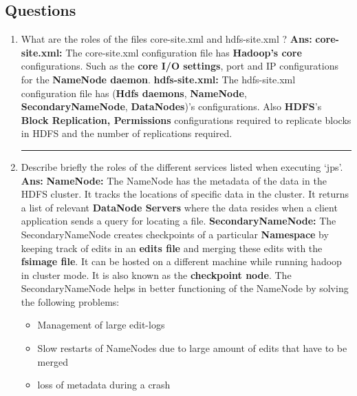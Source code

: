 \documentclass[12pt]{article}
\begin{document}
\subsection{Questions}
\begin{enumerate}
\item What are the roles of the files core-site.xml and hdfs-site.xml ?
\newline
\newline
\textbf{Ans:}
\newline
	\textbf{core-site.xml:}
    \newline
    	The core-site.xml configuration file has \textbf{Hadoop's core} configurations. Such as the \textbf{core I/O settings}, port and IP configurations for the \textbf{NameNode daemon}.
    \newline
    \newline
    \textbf{hdfs-site.xml:}
    \newline
    	The hdfs-site.xml configuration file has (\textbf{Hdfs daemons}, \textbf{NameNode}, \textbf{SecondaryNameNode}, \textbf{DataNodes})'s configurations. Also \textbf{HDFS}'s \textbf{Block Replication, Permissions} configurations required to replicate blocks in HDFS and the number of replications required. \cite{HC}
\newline
\hrule
\item Describe briefly the roles of the different services listed when executing ‘jps’.
\newline
\newline
\textbf{Ans:}
\newline
	\textbf{NameNode:}
    \newline 
    	The NameNode has the metadata of the data in the HDFS cluster. It tracks the locations of specific data in the cluster. It returns a list of relevant \textbf{DataNode Servers} where the data resides when a client application sends a query for locating a file.\cite{NN}
    \newline
    \newline
    \textbf{SecondaryNameNode:}
    \newline
    	The SecondaryNameNode creates checkpoints of a particular \textbf{Namespace} by keeping track of edits in an \textbf{edits file} and merging these edits with the \textbf{fsimage file}. It can be hosted on a different machine while running hadoop in cluster mode. It is also known as the \textbf{checkpoint node}.\cite{NN}
        \newpage
        The SecondaryNameNode helps in better functioning of the NameNode by solving the following problems:
        	\begin{itemize}
        	\item Management of large edit-logs
            \item Slow restarts of NameNodes due to large amount of edits that have to be merged
            \item loss of metadata during a crash
        	\end{itemize}
    

\end{enumerate}
\end{document}
